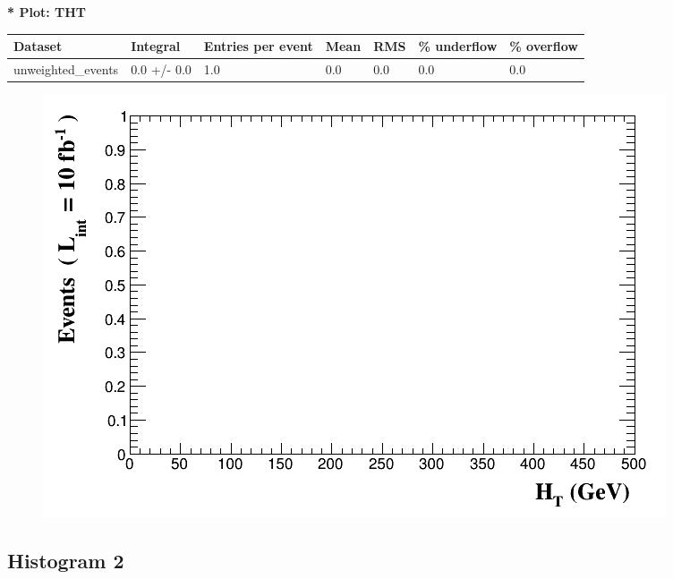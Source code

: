 \documentclass[a4paper, 10pt]{article}
\begin{document}
\textbf{* Plot: THT}\\
   \begin{table}[H]
  \begin{center}
    \begin{tabular}{|m{23.0mm}|m{23.0mm}|m{18.0mm}|m{19.0mm}|m{19.0mm}|m{19.0mm}|m{19.0mm}|}
      \hline
      {\cellcolor{yellow}         Dataset}& {\cellcolor{yellow}         Integral}& {\cellcolor{yellow}         Entries per event}& {\cellcolor{yellow}         Mean}& {\cellcolor{yellow}         RMS}& {\cellcolor{yellow}         \% underflow}& {\cellcolor{yellow}         \% overflow}\\
      \hline
      {\cellcolor{white}         unweighted\_events}& {\cellcolor{white}         0.0 +/\-- 0.0}& {\cellcolor{white}         1.0}& {\cellcolor{white}         0.0}& {\cellcolor{white}         0.0}& {\cellcolor{green}         0.0}& {\cellcolor{green}         0.0}\\
\hline
    \end{tabular}
  \end{center}
\end{table}

\begin{figure}[H]
  \begin{center}
    \includegraphics[scale=0.45]{selection_0.png}\\
\caption{   }
  \end{center}
\end{figure}
      \newpage
\subsection{ Histogram 2}
\end{document}
